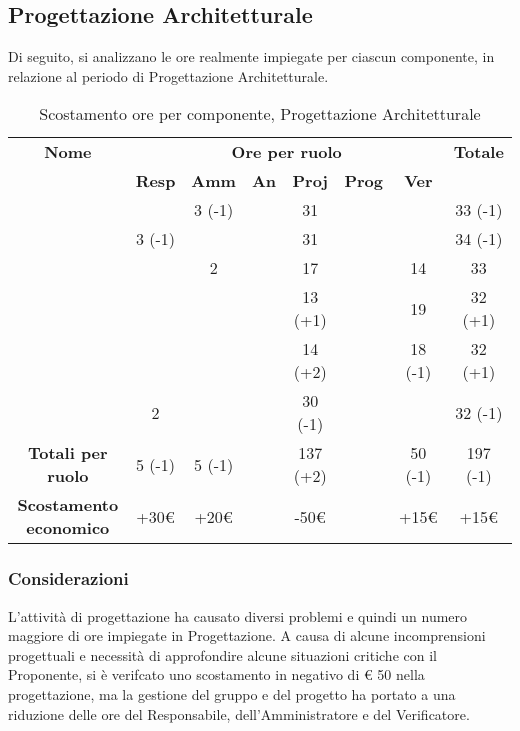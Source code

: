 \newpage
\subsection{Progettazione Architetturale}

Di seguito, si analizzano le ore realmente impiegate per ciascun componente, in relazione al periodo di Progettazione Architetturale.

\begin{table}[H]
	\begin{center}
		\begin{tabular}{|c|c|c|c|c|c|c|c|}
			\hline
			\textbf{Nome} & \multicolumn{6}{c|}{\textbf{Ore per ruolo}} & \textbf{Totale} \\\cline{2-7}
			& \textbf{Resp} & \textbf{Amm} & \textbf{An} & \textbf{Proj} & \textbf{Prog} & \textbf{Ver} & \\
			\hline
			\MC			&		&	3 (-1)	&		&	31		&		&		&   33	(-1)\\
			\hline
			\AN			&3 (-1)	&			&		&	31		&		&		& 	34 (-1)	\\
			\hline
			\DAN		&		&	2		&		&	17		&		&	14	&	33	\\
			\hline
			\AS			&		&		 	&	 	&	13 (+1)	&	 	& 	19	&	32 (+1)	\\
			\hline
			\NS 		&		&			&		&	14 (+2)	&		& 	18 (-1)	&	32 (+1)	\\
			\hline
			\DS			& 	2	&			&		&	30 (-1)	&		&		&	32 (-1)	\\
			\hline
			\textbf{Totali per ruolo}	& 	5 (-1)	&	5 (-1)	&		&	137 (+2)	&		&	50 (-1)	&	197 (-1)	\\
			\hline
			\textbf{Scostamento economico}	& 	+30€	&	+20€	&		&	-50€	&		&	+15€	&	+15€	\\
			\hline
		\end{tabular}
	\end{center}
	\caption{Scostamento ore per componente, Progettazione Architetturale}
\end{table}

\subsubsection{Considerazioni}
L'attività di progettazione ha causato diversi problemi e quindi un numero maggiore di ore impiegate in Progettazione. A causa di alcune incomprensioni progettuali e necessità di approfondire alcune situazioni critiche con il Proponente, si è verifcato uno scostamento in negativo di € 50 nella progettazione, ma la gestione del gruppo e del progetto ha portato a una riduzione delle ore del Responsabile, dell'Amministratore e del Verificatore.

